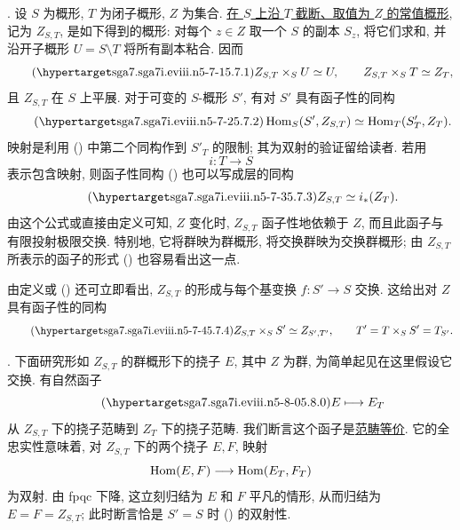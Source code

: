 \medskip
\noindent {}. 设 $S$ 为概形, $T$ 为闭子概形, $Z$ 为集合. \underline{在 $S$ 上沿 $T$ 截断、取值为 $Z$ 的常值概形}, 记为 $Z_{S,T}$, 是如下得到的概形: 对每个 $z\in Z$ 取一个 $S$ 的副本 $S_z$, 将它们求和, 并沿开子概形 $U=S\setminus T$ 将所有副本粘合. 因而
\begin{equation}\tag{\SGARefTarget{sga7.sga7i.eviii.n5-7-1}{5.7.1}}
 Z_{S,T}\times_S U\simeq U,
 \qquad
 Z_{S,T}\times_S T\simeq Z_T,
\end{equation}
且 $Z_{S,T}$ 在 $S$ 上平展. 对于可变的 $S$-概形 $S'$, 有对 $S'$ 具有函子性的同构
\begin{equation}\tag{\SGARefTarget{sga7.sga7i.eviii.n5-7-2}{5.7.2}}
 \Hom_S(S',Z_{S,T})\simeq\Hom_T(S'_T,Z_T).
\end{equation}
映射是利用 () 中第二个同构作到 $S'_T$ 的限制; 其为双射的验证留给读者. 若用
\[
 i:T\longrightarrow S
\]
表示包含映射, 则函子性同构 () 也可以写成层的同构
\begin{equation}\tag{\SGARefTarget{sga7.sga7i.eviii.n5-7-3}{5.7.3}}
 Z_{S,T}\simeq i_*(Z_T).
\end{equation}
由这个公式或直接由定义可知, $Z$ 变化时, $Z_{S,T}$ 函子性地依赖于 $Z$, 而且此函子与有限投射极限交换. 特别地, 它将群映为群概形, 将交换群映为交换群概形; 由 $Z_{S,T}$ 所表示的函子的形式 () 也容易看出这一点.

由定义或 () 还可立即看出, $Z_{S,T}$ 的形成与每个基变换 $f:S'\to S$ 交换. 这给出对 $Z$ 具有函子性的同构
\begin{equation}\tag{\SGARefTarget{sga7.sga7i.eviii.n5-7-4}{5.7.4}}
 Z_{S,T}\times_S S'\simeq Z_{S',T'},
 \qquad T'=T\times_S S'=T_{S'}.
\end{equation}

\medskip
\noindent {}. 下面研究形如 $Z_{S,T}$ 的群概形下的挠子 $E$, 其中 $Z$ 为群, 为简单起见在这里假设它交换. 有自然函子
\begin{equation}\tag{\SGARefTarget{sga7.sga7i.eviii.n5-8-0}{5.8.0}}
 E\longmapsto E_T
\end{equation}
从 $Z_{S,T}$ 下的挠子范畴到 $Z_T$ 下的挠子范畴. 我们断言这个函子是\underline{范畴等价}. 它的全忠实性意味着, 对 $Z_{S,T}$ 下的两个挠子 $E,F$, 映射
\[
 \operatorname{Hom}(E,F)\longrightarrow\operatorname{Hom}(E_T,F_T)
\]
为双射. 由 fpqc 下降, 这立刻归结为 $E$ 和 $F$ 平凡的情形, 从而归结为 $E=F=Z_{S,T}$; 此时断言恰是 $S'=S$ 时 () 的双射性.


